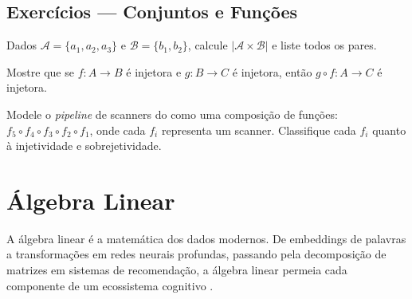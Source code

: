 \subsection{Exercícios — Conjuntos e Funções}
\begin{exercicio}
Dados $\mathcal{A} = \{a_1, a_2, a_3\}$ e $\mathcal{B} = \{b_1, b_2\}$,
calcule $|\mathcal{A} \times \mathcal{B}|$ e liste todos os pares.
\end{exercicio}
\begin{exercicio}
Mostre que se $f: A \to B$ é injetora e $g: B \to C$ é injetora, então
$g \circ f: A \to C$ é injetora.
\end{exercicio}
\begin{exercicio}
Modele o \textit{pipeline} de scanners do \opencodeeco{} como uma
composição de funções: $f_5 \circ f_4 \circ f_3 \circ f_2 \circ f_1$,
onde cada $f_i$ representa um scanner. Classifique cada $f_i$ quanto à
injetividade e sobrejetividade.
\end{exercicio}
\section{Álgebra Linear}
\label{sec:algebra-linear}
\nivelintermediario
A álgebra linear é a matemática dos dados modernos. De embeddings de palavras
a transformações em redes neurais profundas, passando pela decomposição de
matrizes em sistemas de recomendação, a álgebra linear permeia cada
componente de um ecossistema cognitivo \cite{strang2016algebra,
goodfellow2016deep, bishop2006pattern}.
